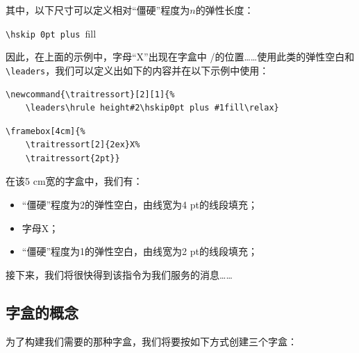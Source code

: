 其中，以下尺寸可以定义相对“僵硬”程度为$n$的弹性长度：

\begin{dmd}
\verb|\hskip 0pt plus |fill
\end{dmd}

\newcommand{\mafraction}[2]{%
\raisebox{0.5ex}{#1}%
\slash\raisebox{-0.5ex}{#2}}

因此，在上面的示例中，字母“X”出现在字盒中\mafraction{2}{5}的位置……使用此类的弹性空白和\verb|\leaders|，我们可以定义出如下的内容并在以下示例中使用：

\begin{dmd}
\begin{verbatim}
\newcommand{\traitressort}[2][1]{%
    \leaders\hrule height#2\hskip0pt plus #1fill\relax}\end{verbatim}
\end{dmd}

\begin{codelist}[10.18]{
}
\begin{verbatim}
\framebox[4cm]{%
    \traitressort[2]{2ex}X%
    \traitressort{2pt}}\end{verbatim}
\end{codelist}

在该5 cm宽的字盒中，我们有：

\begin{itemize}
    \item “僵硬”程度为2的弹性空白，由线宽为4 pt的线段填充；
    \item 字母X；
    \item “僵硬”程度为1的弹性空白，由线宽为2 pt的线段填充；
\end{itemize}

接下来，我们将很快得到该指令为我们服务的消息……

\subsection{字盒的概念}

为了构建我们需要的那种字盒，我们将要按如下方式创建三个字盒：

\begin{center}
    \fbox{\parbox{3pt}{%
        \rule{0pt}{1.215cm}%
        \rule{3pt}{1.025cm}}}%
    \parbox[][1.5cm][c]{4cm}{%
        \begin{flushleft}
          \\\nointerlineskip
          \\\nointerlineskip
          \framebox[4cm]{\traitressort{3pt}}
        \end{flushleft}}%
    \fbox{\parbox{3pt}{%
        \rule{0pt}{1.215cm}%
        \rule{3pt}{1.025cm}}}
\end{center}


